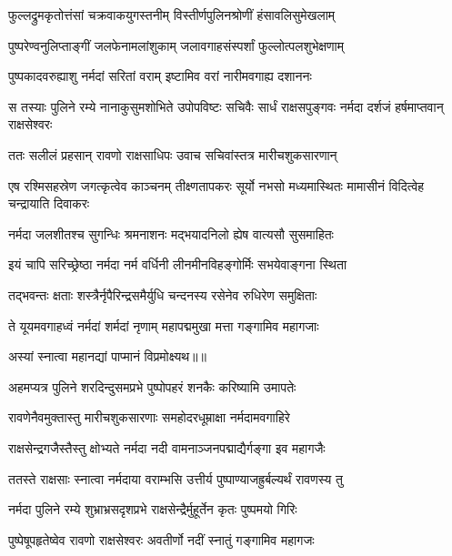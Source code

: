 \twolineshloka
{फुल्लद्रुमकृतोत्तंसां चक्रवाकयुगस्तनीम्}
{विस्तीर्णपुलिनश्रोणीं हंसावलिसुमेखलाम्} %

\twolineshloka
{पुष्परेण्वनुलिप्ताङ्गीं जलफेनामलांशुकाम्}
{जलावगाहसंस्पर्शां फुल्लोत्पलशुभेक्षणाम्} %

\twolineshloka
{पुष्पकादवरुह्याशु नर्मदां सरितां वराम्}
{इष्टामिव वरां नारीमवगाह्य दशाननः} %

\threelineshloka
{स तस्याः पुलिने रम्ये नानाकुसुमशोभिते}
{उपोपविष्टः सचिवैः सार्धं राक्षसपुङ्गवः}
{नर्मदा दर्शजं हर्षमाप्तवान् राक्षसेश्वरः} %

\twolineshloka
{ततः सलीलं प्रहसान् रावणो राक्षसाधिपः}
{उवाच सचिवांस्तत्र मारीचशुकसारणान्} %

\threelineshloka
{एष रश्मिसहस्रेण जगत्कृत्वेव काञ्चनम्}
{तीक्ष्णतापकरः सूर्यो नभसो मध्यमास्थितः}
{मामासीनं विदित्वेह चन्द्रायाति दिवाकरः} %

\twolineshloka
{नर्मदा जलशीतश्च सुगन्धिः श्रमनाशनः}
{मद्भयादनिलो ह्येष वात्यसौ सुसमाहितः} %

\twolineshloka
{इयं चापि सरिच्छ्रेष्ठा नर्मदा नर्म वर्धिनी}
{लीनमीनविहङ्गोर्मिः सभयेवाङ्गना स्थिता} %

\twolineshloka
{तद्भवन्तः क्षताः शस्त्रैर्नृपैरिन्द्रसमैर्युधि}
{चन्दनस्य रसेनेव रुधिरेण समुक्षिताः} %

\twolineshloka
{ते यूयमवगाहध्वं नर्मदां शर्मदां नृणाम्}
{महापद्ममुखा मत्ता गङ्गामिव महागजाः} %

{अस्यां स्नात्वा महानद्यां पाप्मानं विप्रमोक्ष्यथ॥॥} %

\addtocounter{shlokacount}{1}

\twolineshloka
{अहमप्यत्र पुलिने शरदिन्दुसमप्रभे}
{पुष्पोपहरं शनकैः करिष्यामि उमापतेः} %

\twolineshloka
{रावणेनैवमुक्तास्तु मारीचशुकसारणाः}
{समहोदरधूम्राक्षा नर्मदामवगाहिरे} %

\twolineshloka
{राक्षसेन्द्रगजैस्तैस्तु क्षोभ्यते नर्मदा नदी}
{वामनाञ्जनपद्माद्यैर्गङ्गा इव महागजैः} %

\twolineshloka
{ततस्ते राक्षसाः स्नात्वा नर्मदाया वराम्भसि}
{उत्तीर्य पुष्पाण्याजह्रुर्बल्यर्थं रावणस्य तु} %

\twolineshloka
{नर्मदा पुलिने रम्ये शुभ्राभ्रसदृशप्रभे}
{राक्षसेन्द्रैर्मुहूर्तेन कृतः पुष्पमयो गिरिः} %

\twolineshloka
{पुष्पेषूपहृतेष्वेव रावणो राक्षसेश्वरः}
{अवतीर्णो नदीं स्नातुं गङ्गामिव महागजः} %

